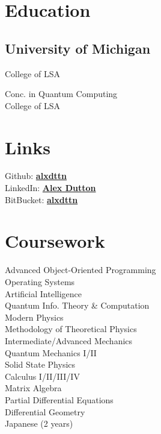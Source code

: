\documentclass[letterpaper]{headers} %
\begin{document}

\begin{minipage}[t]{0.33\textwidth}
\section{Education}
	\subsection{University of Michigan}
		College of LSA \\

		\sectionspace
		
		Conc. in Quantum Computing \\
		College of LSA \\
\sectionspace

\section{Links}
	Github: \href{https://github.com/alxdttn}{\bf alxdttn}\\
	LinkedIn: \href{https://www.linkedin.com/in/alex-dutton-47a40a137/}{\bf Alex Dutton} \\
	BitBucket: \href{https://bitbucket.org/alxdttn}{\bf alxdttn}\\

\sectionspace

\section{Coursework}
	Advanced Object-Oriented Programming \\
	Operating Systems \\
	Artificial Intelligence \\
	Quantum Info. Theory \& Computation \\
	Modern Physics \\
	Methodology of Theoretical Physics \\
	Intermediate/Advanced Mechanics \\
	Quantum Mechanics I/II \\
	Solid State Physics \\
	Calculus I/II/III/IV \\
	Matrix Algebra \\
	Partial Differential Equations \\
	Differential Geometry \\
	Japanese (2 years) \\
\sectionspace


\end{minipage}
\end{document}
